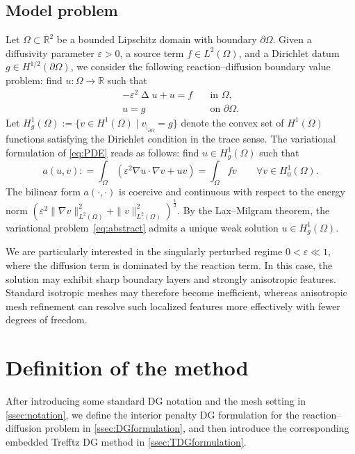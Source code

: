 \documentclass[a4paper,twoside,10pt]{article}
\newenvironment{eqs} %
 { \begin{equation} \begin{aligned} } %
 { \end{aligned} \end{equation} \ignorespacesafterend } %
\DeclareMathOperator{\Lap}{\Delta}
\newcommand{\eps}{\varepsilon}
\newcommand{\IR}{\mathbb{R}}
\numberwithin{equation}{section}
\begin{document}
    \subsection{Model problem}\label{sect::modelproblem}
	Let $\Omega\subset \mathbb{R}^2$ be a bounded Lipschitz domain with boundary $\partial\Omega$.
	Given a diffusivity parameter $\varepsilon>0$, a source term $f\in L^2(\Omega)$, and a Dirichlet datum $g\in H^{1/2}(\partial\Omega)$, we consider the following reaction--diffusion boundary value problem: find $u:\Omega \to \IR$ such that
	\begin{eqs}\label{eq:PDE}
		-\eps^2 \Lap u + u = f \quad &\text{in } \Omega,\\
		u = g \quad &\text{on } \partial\Omega.
	\end{eqs}
	Let $ H^1_g(\Omega):=\{v\in H^1(\Omega)\mid v_{|_{\partial\Omega}}=g\} $ denote the %
    convex set of $H^1(\Omega)$ functions satisfying the Dirichlet condition in the trace sense.
	The variational formulation of \eqref{eq:PDE} reads as follows: find $u\in H^1_g(\Omega)$ such that
		\begin{equation*}\label{eq:abstract}
		a(u,v): =	\int_\Omega \left(\eps^2 \nabla u\cdot \nabla v + uv\right)=  \int_\Omega fv
			\qquad \forall v\in H^1_0(\Omega).
		\end{equation*}
	The bilinear form $a(\cdot,\cdot)$ is coercive and continuous with respect to the energy norm
	$(\varepsilon^2 \|\nabla v\|_{L^2(\Omega)}^2 + \|v\|_{L^2(\Omega)}^2)^\frac12$. By the Lax--Milgram theorem, the variational problem~\eqref{eq:abstract} admits a unique weak solution $u\in H^1_g(\Omega)$. 

	We are particularly interested in the singularly perturbed regime $0 < \varepsilon \ll 1$, where the diffusion term is dominated by the reaction term. In this case, the solution may exhibit sharp boundary layers and strongly anisotropic features. Standard isotropic meshes may therefore become inefficient, whereas anisotropic mesh refinement can resolve such localized features more effectively with fewer degrees of freedom.
	\section{Definition of the method} \label{sec:DG}
	After introducing some standard DG notation and the mesh setting in \cref{ssec:notation}, we define the interior penalty DG formulation for the reaction--diffusion problem in \cref{ssec:DGformulation}, and then introduce the corresponding embedded Trefftz DG method in \cref{ssec:TDGformulation}.
	
\end{document}
